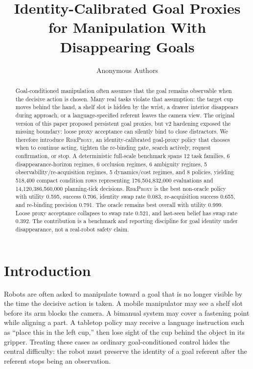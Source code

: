 \documentclass{article}
\title{Identity-Calibrated Goal Proxies\\for Manipulation With Disappearing Goals}
\author{Anonymous Authors}
\newcommand{\method}{\textsc{RiskProxy}\xspace}
\begin{document}
\maketitle

\begin{abstract}
Goal-conditioned manipulation often assumes that the goal remains observable when the decisive action is chosen. Many real tasks violate that assumption: the target cup moves behind the hand, a shelf slot is hidden by the wrist, a drawer interior disappears during approach, or a language-specified referent leaves the camera view. The original version of this paper proposed persistent goal proxies, but v2 hardening exposed the missing boundary: loose proxy acceptance can silently bind to close distractors. We therefore introduce \method, an identity-calibrated goal-proxy policy that chooses when to continue acting, tighten the re-binding gate, search actively, request confirmation, or stop. A deterministic full-scale benchmark spans 12 task families, 6 disappearance-horizon regimes, 6 occlusion regimes, 6 ambiguity regimes, 5 observability/re-acquisition regimes, 5 dynamics/cost regimes, and 8 policies, yielding 518,400 compact condition rows representing 176,504,832,000 evaluations and 14,120,386,560,000 planning-tick decisions. \method is the best non-oracle policy with utility 0.595, success 0.706, identity swap rate 0.083, re-acquisition success 0.655, and re-binding precision 0.791. The oracle remains best overall with utility 0.999. Loose proxy acceptance collapses to swap rate 0.521, and last-seen belief has swap rate 0.392. The contribution is a benchmark and reporting discipline for goal identity under disappearance, not a real-robot safety claim.
\end{abstract}

\section{Introduction}

Robots are often asked to manipulate toward a goal that is no longer visible by the time the decisive action is taken. A mobile manipulator may see a shelf slot before its arm blocks the camera. A bimanual system may cover a fastening point while aligning a part. A tabletop policy may receive a language instruction such as ``place this in the left cup,'' then lose sight of the cup behind the object in its gripper. Treating these cases as ordinary goal-conditioned control hides the central difficulty: the robot must preserve the identity of a goal referent after the referent stops being an observation.
\end{document}
